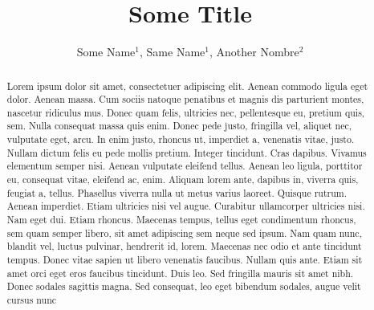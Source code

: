 \documentclass[]{cik}%
\begin{document}
\title{Some Title}

\author{
Some Name$^{1}$,
Same Name$^{1}$,
Another Nombre$^{2}$}

\address{
  $^{1}$Fake University\\
  $^{2}$Fake Place}
\subject{
Another Science}






\begin{abstract}
Lorem ipsum dolor sit amet, consectetuer adipiscing elit. Aenean commodo
ligula eget dolor. Aenean massa. Cum sociis natoque penatibus et magnis
dis parturient montes, nascetur ridiculus mus. Donec quam felis,
ultricies nec, pellentesque eu, pretium quis, sem. Nulla consequat massa
quis enim. Donec pede justo, fringilla vel, aliquet nec, vulputate eget,
arcu. In enim justo, rhoncus ut, imperdiet a, venenatis vitae, justo.
Nullam dictum felis eu pede mollis pretium. Integer tincidunt. Cras
dapibus. Vivamus elementum semper nisi. Aenean vulputate eleifend
tellus. Aenean leo ligula, porttitor eu, consequat vitae, eleifend ac,
enim. Aliquam lorem ante, dapibus in, viverra quis, feugiat a, tellus.
Phasellus viverra nulla ut metus varius laoreet. Quisque rutrum. Aenean
imperdiet. Etiam ultricies nisi vel augue. Curabitur ullamcorper
ultricies nisi. Nam eget dui. Etiam rhoncus. Maecenas tempus, tellus
eget condimentum rhoncus, sem quam semper libero, sit amet adipiscing
sem neque sed ipsum. Nam quam nunc, blandit vel, luctus pulvinar,
hendrerit id, lorem. Maecenas nec odio et ante tincidunt tempus. Donec
vitae sapien ut libero venenatis faucibus. Nullam quis ante. Etiam sit
amet orci eget eros faucibus tincidunt. Duis leo. Sed fringilla mauris
sit amet nibh. Donec sodales sagittis magna. Sed consequat, leo eget
bibendum sodales, augue velit cursus nunc
\end{abstract}

\providecommand{\tightlist}{%
  \setlength{\itemsep}{0pt}\setlength{\parskip}{0pt}}
\providecommand{\EndFirstPage}{%
}
\end{document}
